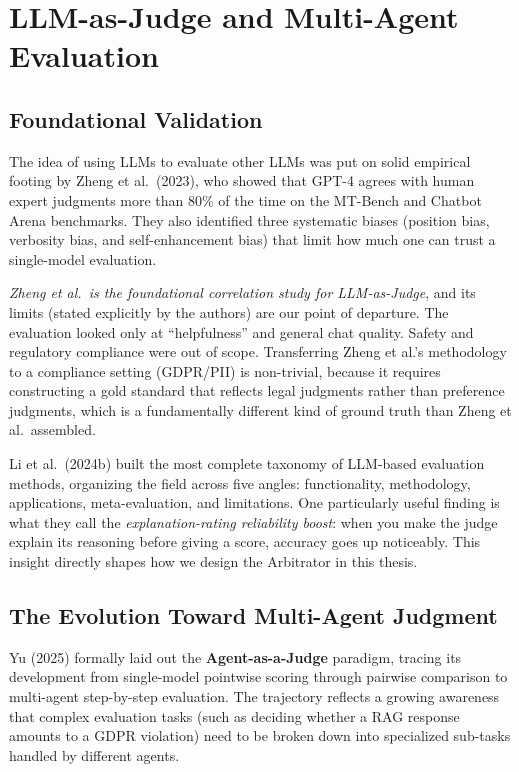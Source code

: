 \documentclass[12pt,a4paper]{report}
\begin{document}
\newpage
\section{LLM-as-Judge and Multi-Agent Evaluation}
\label{sec:llm-judge}

\subsection{Foundational Validation}

The idea of using LLMs to evaluate other LLMs was put on solid empirical footing by Zheng et al.\ (2023), who showed that GPT-4 agrees with human expert judgments more than 80\% of the time on the MT-Bench and Chatbot Arena benchmarks. They also identified three systematic biases (position bias, verbosity bias, and self-enhancement bias) that limit how much one can trust a single-model evaluation.

\begin{critbox}
\textit{Zheng et al.\ is the foundational correlation study for LLM-as-Judge}, and its limits (stated explicitly by the authors) are our point of departure. The evaluation looked only at ``helpfulness'' and general chat quality. Safety and regulatory compliance were out of scope. Transferring Zheng et al.'s methodology to a compliance setting (GDPR/PII) is non-trivial, because it requires constructing a gold standard that reflects legal judgments rather than preference judgments, which is a fundamentally different kind of ground truth than Zheng et al.\ assembled.
\end{critbox}

Li et al.\ (2024b) built the most complete taxonomy of LLM-based evaluation methods, organizing the field across five angles: functionality, methodology, applications, meta-evaluation, and limitations. One particularly useful finding is what they call the \emph{explanation-rating reliability boost}: when you make the judge explain its reasoning before giving a score, accuracy goes up noticeably. This insight directly shapes how we design the Arbitrator in this thesis.

\subsection{The Evolution Toward Multi-Agent Judgment}

Yu (2025) formally laid out the \textbf{Agent-as-a-Judge} paradigm, tracing its development from single-model pointwise scoring through pairwise comparison to multi-agent step-by-step evaluation. The trajectory reflects a growing awareness that complex evaluation tasks (such as deciding whether a RAG response amounts to a GDPR violation) need to be broken down into specialized sub-tasks handled by different agents.
\end{document}
